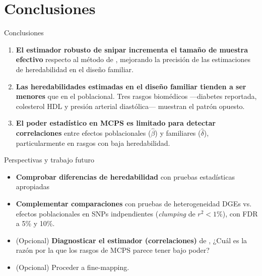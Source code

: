 \section{Conclusiones}

\begin{frame}[c]{Conclusiones}
    \begin{enumerate}
        \item \textbf{El estimador robusto de snipar incrementa el tamaño de muestra efectivo} respecto al método de \textcite{young2022-fgwas}, mejorando la precisión de las estimaciones de heredabilidad en el diseño familiar.
        \item \textbf{Las heredabilidades estimadas en el diseño familiar tienden a ser menores} que en el poblacional. Tres rasgos biomédicos ---diabetes reportada, colesterol HDL y presión arterial diastólica--- muestran el patrón opuesto.
        \item \textbf{El poder estadístico en MCPS es limitado para detectar correlaciones} entre efectos poblacionales ($\hat{\beta}$) y familiares ($\hat{\delta}$), particularmente en rasgos con baja heredabilidad.
    \end{enumerate}
\end{frame}

\begin{frame}[c]{Perspectivas y trabajo futuro}
    \begin{itemize}
        \item \textbf{Comprobar diferencias de heredabilidad} con pruebas estadísticas apropiadas
        \item \textbf{Complementar comparaciones} con pruebas de heterogeneidad DGEs vs. efectos poblacionales en SNPs indpendientes (\textit{clumping} de $r^2 < 1\%$), con FDR a 5\% y 10\%.
        \item (Opcional) \textbf{Diagnosticar el estimador (correlaciones)} de \textcite{young2022-fgwas}, ¿Cuál es la razón por la que los rasgos de MCPS parece tener bajo poder?
        \item (Opcional) Proceder a fine-mapping.
    \end{itemize}
\end{frame}